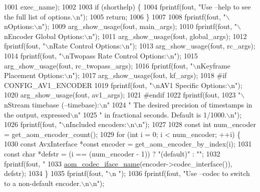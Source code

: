 \begin{DoxyCodeInclude}
{{{{{{{{1001           exec\_name);
1002 
1003   \textcolor{keywordflow}{if} (shorthelp) \{
1004     fprintf(fout, \textcolor{stringliteral}{"Use --help to see the full list of options.\(\backslash\)n"});
1005     \textcolor{keywordflow}{return};
1006   \}
1007 
1008   fprintf(fout, \textcolor{stringliteral}{"\(\backslash\)nOptions:\(\backslash\)n"});
1009   arg\_show\_usage(fout, main\_args);
1010   fprintf(fout, \textcolor{stringliteral}{"\(\backslash\)nEncoder Global Options:\(\backslash\)n"});
1011   arg\_show\_usage(fout, global\_args);
1012   fprintf(fout, \textcolor{stringliteral}{"\(\backslash\)nRate Control Options:\(\backslash\)n"});
1013   arg\_show\_usage(fout, rc\_args);
1014   fprintf(fout, \textcolor{stringliteral}{"\(\backslash\)nTwopass Rate Control Options:\(\backslash\)n"});
1015   arg\_show\_usage(fout, rc\_twopass\_args);
1016   fprintf(fout, \textcolor{stringliteral}{"\(\backslash\)nKeyframe Placement Options:\(\backslash\)n"});
1017   arg\_show\_usage(fout, kf\_args);
1018 \textcolor{preprocessor}{#if CONFIG\_AV1\_ENCODER}
1019   fprintf(fout, \textcolor{stringliteral}{"\(\backslash\)nAV1 Specific Options:\(\backslash\)n"});
1020   arg\_show\_usage(fout, av1\_args);
1021 \textcolor{preprocessor}{#endif}
1022   fprintf(fout,
1023           \textcolor{stringliteral}{"\(\backslash\)nStream timebase (--timebase):\(\backslash\)n"}
1024           \textcolor{stringliteral}{"  The desired precision of timestamps in the output, expressed\(\backslash\)n"}
1025           \textcolor{stringliteral}{"  in fractional seconds. Default is 1/1000.\(\backslash\)n"});
1026   fprintf(fout, \textcolor{stringliteral}{"\(\backslash\)nIncluded encoders:\(\backslash\)n\(\backslash\)n"});
1027 
1028   \textcolor{keyword}{const} \textcolor{keywordtype}{int} num\_encoder = get\_aom\_encoder\_count();
1029   \textcolor{keywordflow}{for} (\textcolor{keywordtype}{int} i = 0; i < num\_encoder; ++i) \{
1030     \textcolor{keyword}{const} AvxInterface *\textcolor{keyword}{const} encoder = get\_aom\_encoder\_by\_index(i);
1031     \textcolor{keyword}{const} \textcolor{keywordtype}{char} *defstr = (i == (num\_encoder - 1)) ? \textcolor{stringliteral}{"(default)"} : \textcolor{stringliteral}{""};
1032     fprintf(fout, \textcolor{stringliteral}{"    %
1033             \hyperlink{group__codec_ga013b1f6d96b2cf9489396311a7e5179b}{aom\_codec\_iface\_name}(encoder->codec\_interface()), defstr);
1034   \}
1035   fprintf(fout, \textcolor{stringliteral}{"\(\backslash\)n        "});
1036   fprintf(fout, \textcolor{stringliteral}{"Use --codec to switch to a non-default encoder.\(\backslash\)n\(\backslash\)n"});
}}}}}}}}}
\end{DoxyCodeInclude}

